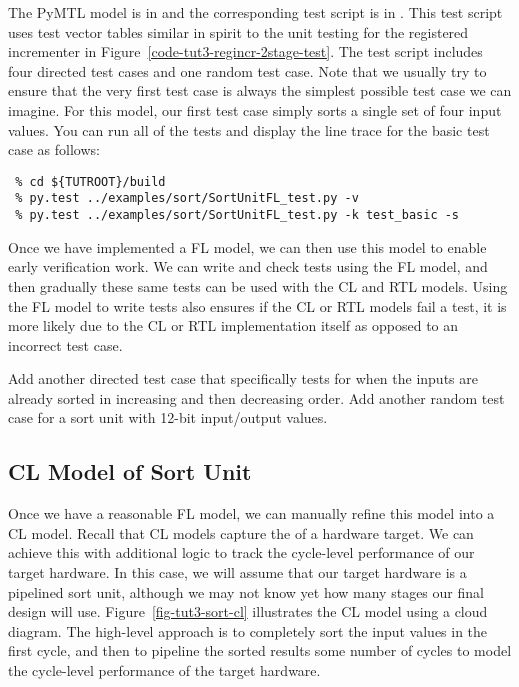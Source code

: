 \documentclass{cbxdoc}
\begin{document}
The PyMTL model is in  and the corresponding test
script is in . This test script uses test vector
tables similar in spirit to the unit testing for the registered
incrementer in Figure~\ref{code-tut3-regincr-2stage-test}. The test
script includes four directed test cases and one random test case. Note
that we usually try to ensure that the very first test case is always the
simplest possible test case we can imagine. For this model, our first
test case simply sorts a single set of four input values. You can run all
of the tests and display the line trace for the basic test case as
follows:

\begin{verbatim}
 % cd ${TUTROOT}/build
 % py.test ../examples/sort/SortUnitFL_test.py -v
 % py.test ../examples/sort/SortUnitFL_test.py -k test_basic -s
\end{verbatim}

Once we have implemented a FL model, we can then use this model to enable
early verification work. We can write and check tests using the FL model,
and then gradually these same tests can be used with the CL and RTL
models. Using the FL model to write tests also ensures if the CL or RTL
models fail a test, it is more likely due to the CL or RTL implementation
itself as opposed to an incorrect test case.

\begin{task}
  Add another directed test case that specifically tests for when the
  inputs are already sorted in increasing and then decreasing order. Add
  another random test case for a sort unit with 12-bit input/output
  values.
\end{task}

\subsection{CL Model of Sort Unit}




Once we have a reasonable FL model, we can manually refine this model
into a CL model. Recall that CL models capture the  of a hardware target. We can achieve this with additional
logic to track the cycle-level performance of our target hardware. In
this case, we will assume that our target hardware is a pipelined sort
unit, although we may not know yet how many stages our final design will
use. Figure~\ref{fig-tut3-sort-cl} illustrates the CL model using a cloud
diagram. The high-level approach is to completely sort the input values
in the first cycle, and then to pipeline the sorted results some number
of cycles to model the cycle-level performance of the target hardware.
\end{document}
